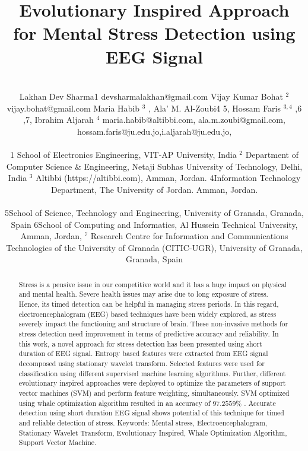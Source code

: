 \title{Evolutionary Inspired Approach for Mental Stress Detection using EEG Signal}
\author{ \\ Lakhan Dev Sharma1 devsharmalakhan@gmail.com Vijay Kumar Bohat $^2$ vijay.bohat@gmail.com Maria Habib $^3$ , Ala’ M. Al-Zoubi4 5, Hossam Faris $^{3,4}$ ,6 ,7, Ibrahim Aljarah $^4$ maria.habib@altibbi.com, ala.m.zoubi@gmail.com, hossam.faris@ju.edu.jo,i.aljarah@ju.edu.jo, \\  \\ 1 School of Electronics Engineering, VIT-AP University, India $^2$ Department of Computer Science & Engineering, Netaji Subhas University of Technology, Delhi, India $^{3}$ Altibbi (https://altibbi.com), Amman, Jordan. 4Information Technology Department, The University of Jordan. Amman, Jordan. \\  \\ 5School of Science, Technology and Engineering, University of Granada, Granada, Spain 6School of Computing and Informatics, Al Hussein Technical University, Amman, Jordan, $^7$ Research Centre for Information and Communications Technologies of the University of Granada (CITIC-UGR), University of Granada, Granada, Spain \\ }
\begin{abstract}
 Stress is a pensive issue in our competitive world and it has a huge impact on physical and mental health. Severe health issues may arise due to long exposure of stress. Hence, its timed detection can be helpful in managing stress periods. In this regard, electroencephalogram (EEG) based techniques have been widely explored, as stress severely impact the functioning and structure of brain. These non-invasive methods for stress detection need improvement in terms of predictive accuracy and reliability. In this work, a novel approach for stress detection has been presented using short duration of EEG signal. Entropy based features were extracted from EEG signal decomposed using stationary wavelet transform. Selected features were used for classification using different supervised machine learning algorithms. Further, different evolutionary inspired approaches were deployed to optimize the parameters of support vector machines (SVM) and perform feature weighting, simultaneously. SVM optimized using whale optimization algorithm resulted in an accuracy of $97.2559\%$ . Accurate detection using short duration EEG signal shows potential of this technique for timed and reliable detection of stress.  Keywords: Mental stress, Electroencephalogram, Stationary Wavelet Transform, Evolutionary Inspired, Whale Optimization Algorithm, Support Vector Machine.  
\end{abstract}
